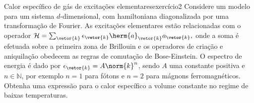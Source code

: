 \begin{exercício}{Calor específico de gás de excitações elementares}{exercício2}
    Considere um modelo para um sistema \(d\)-dimensional, com hamiltoniana diagonalizada por uma transformação de Fourier. As excitações elementares estão relacionadas com o operador \(\mathcal{H} = \sum_{\vetor{k}} \epsilon_{\vetor{k}} \herm{a}_{\vetor{k}}a_{\vetor{k}},\) onde a soma é efetuada sobre a primeira zona de Brillouin e os operadores de criação e aniquilação obedecem as regras de comutação de Bose-Einstein. O espectro de energia é dado por \(\epsilon_{\vetor{k}} = A\norm{k}^n\), sendo \(A\) uma constante positiva e \(n \in \mathbb{N}\), por exemplo \(n = 1\) para fótons e \(n = 2\) para mágnons ferromagnéticos. Obtenha uma expressão para o calor específico a volume constante no regime de baixas temperaturas.
\end{exercício}
